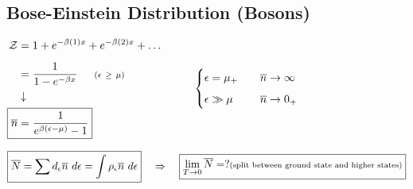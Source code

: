 \documentclass[12pt]{article}
\begin{document}
\vspace{5pt}
\subsection{Bose-Einstein Distribution (Bosons)}
\(\begin{aligned}
    \mathcal{Z} &= 1 + e^{-\beta(1)x} + e^{-\beta(2)x} + \dots \\[5pt]
    &= \frac{1}{1-e^{-\beta x}} \indent {\scriptstyle(\epsilon \ \geq\ \mu)}\\
    &\downarrow\\
    \Aboxed{ \overline{n} &= \frac{1}{ e^{\beta (\epsilon-\mu)} - 1 } }
\end{aligned}
\hspace{1cm}
\begin{cases}
    \epsilon = \mu_+  & \hspace{10pt} \overline{n} \rightarrow \infty\\[5pt]
    \epsilon \gg \mu  & \hspace{10pt} \overline{n} \rightarrow 0_+ 
\end{cases}\)

\vspace{10pt}\noindent
\(\begin{aligned}
    \boxed{ \overline{N} = \sum d_\epsilon \overline{n}\ d\epsilon 
        = \int \rho_\epsilon \overline{n}\ d\epsilon }
\end{aligned} 
\hspace{10pt}
\Rightarrow
\hspace{10pt}
\begin{aligned}
    \boxed{ \lim_{T \rightarrow0} \overline{N} = ? \text{\scriptsize(split between ground state and higher states)} }
\end{aligned}\)

\vspace{5pt}
\end{document}
